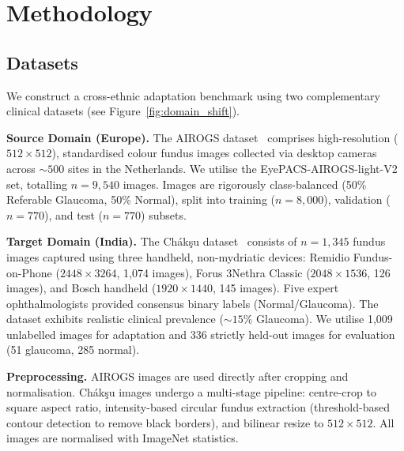 \documentclass[11pt,twocolumn]{article}
\begin{document}
\section{Methodology}
\label{sec:methods}

\subsection{Datasets}
\label{sec:datasets}

We construct a cross-ethnic adaptation benchmark using two complementary clinical datasets (see Figure~\ref{fig:domain_shift}).

\textbf{Source Domain (Europe).} The AIROGS dataset~\citep{vermeer2024airogs, kiefer2024eyepacs} comprises high-resolution ($512 \times 512$), standardised colour fundus images collected via desktop cameras across ${\sim}500$ sites in the Netherlands. We utilise the EyePACS-AIROGS-light-V2 set, totalling $n{=}9{,}540$ images. Images are rigorously class-balanced (50\% Referable Glaucoma, 50\% Normal), split into training ($n{=}8{,}000$), validation ($n{=}770$), and test ($n{=}770$) subsets.

\textbf{Target Domain (India).} The Ch\'{a}k\c{s}u dataset~\citep{kumar2023chakshu} consists of $n{=}1{,}345$ fundus images captured using three handheld, non-mydriatic devices: Remidio Fundus-on-Phone ($2448\times3264$, 1,074 images), Forus 3Nethra Classic ($2048\times1536$, 126 images), and Bosch handheld ($1920\times1440$, 145 images). Five expert ophthalmologists provided consensus binary labels (Normal/Glaucoma). The dataset exhibits realistic clinical prevalence (${\sim}15\%$ Glaucoma). We utilise 1,009 unlabelled images for adaptation and 336 strictly held-out images for evaluation (51 glaucoma, 285 normal).

\textbf{Preprocessing.} AIROGS images are used directly after cropping and normalisation. Ch\'{a}k\c{s}u images undergo a multi-stage pipeline: centre-crop to square aspect ratio, intensity-based circular fundus extraction (threshold-based contour detection to remove black borders), and bilinear resize to $512\times512$. All images are normalised with ImageNet statistics.
\end{document}
